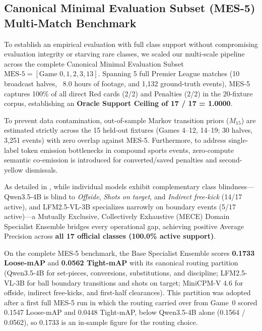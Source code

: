 \documentclass[10pt,twocolumn,letterpaper]{article}
\begin{document}
\subsection{Canonical Minimal Evaluation Subset (MES-5) Multi-Match Benchmark}
To establish an empirical evaluation with full class support without compromising evaluation integrity or starving rare classes, we scaled our multi-scale pipeline across the complete Canonical Minimal Evaluation Subset $\text{MES-5} = [\text{Game } 0, 1, 2, 3, 13]$. Spanning 5 full Premier League matches (10 broadcast halves, ~8.0 hours of footage, and 1,132 ground-truth events), MES-5 captures 100\% of all direct Red cards (2/2) and Penalties (2/2) in the 20-fixture corpus, establishing an \textbf{Oracle Support Ceiling of 17 / 17 = 1.0000}.

To prevent data contamination, out-of-sample Markov transition priors ($M_{15}$) are estimated strictly across the 15 held-out fixtures (Games 4--12, 14--19; 30 halves, 3,251 events) with zero overlap against MES-5. Furthermore, to address single-label token emission bottlenecks in compound sports events, zero-compute semantic co-emission is introduced for converted/saved penalties and second-yellow dismissals.

As detailed in , while individual models exhibit complementary class blindness—Qwen3.5-4B is blind to \textit{Offside}, \textit{Shots on target}, and \textit{Indirect free-kick} (14/17 active), and LFM2.5-VL-3B specializes narrowly on boundary events (5/17 active)—a Mutually Exclusive, Collectively Exhaustive (MECE) Domain Specialist Ensemble bridges every operational gap, achieving positive Average Precision across \textbf{all 17 official classes (100.0\% active support)}. 

On the complete MES-5 benchmark, the Base Specialist Ensemble scores \textbf{0.1733 Loose-mAP} and \textbf{0.0562 Tight-mAP} with its canonical routing partition (Qwen3.5-4B for set-pieces, conversions, substitutions, and discipline; LFM2.5-VL-3B for ball boundary transitions and shots on target; MiniCPM-V 4.6 for offside, indirect free-kicks, and first-half clearances). This partition was adopted after a first full MES-5 run in which the routing carried over from Game~0 scored 0.1547 Loose-mAP and 0.0448 Tight-mAP, below Qwen3.5-4B alone (0.1564 / 0.0562), so 0.1733 is an in-sample figure for the routing choice.
\end{document}
